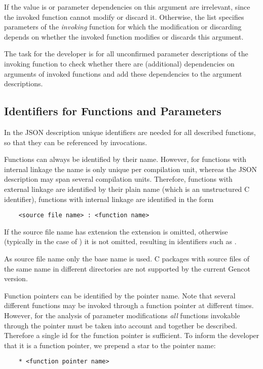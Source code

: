 If the value is  or  parameter dependencies on this argument are irrelevant, since
the invoked function cannot modify or discard it. Otherwise, the list specifies parameters of the \textit{invoking}
function for which the modification or discarding depends on whether the invoked function modifies or discards this
argument.

The task for the developer is for all unconfirmed parameter descriptions of the invoking function to check whether
there are (additional) dependencies on arguments of invoked functions and add these dependencies to the argument 
descriptions.

\subsection{Identifiers for Functions and Parameters}
\label{impl-parmod-ids}

In the JSON description unique identifiers are needed for all described functions, so that they can be referenced by
invocations.

Functions can always be identified by their name. However, for functions with internal linkage the name is only unique
per compilation unit, whereas the JSON description may span several compilation units. Therefore, functions with 
external linkage are identified by their plain name (which is an unstructured C identifier), functions with
internal linkage are identified in the form
\begin{verbatim}
    <source file name> : <function name>
\end{verbatim}
If the source file name has extension  the extension is omitted, otherwise (typically in the case of )
it is not omitted, resulting in identifiers such as .

As source file name only the base name is used. C packages with source files of the same name in different directories are
not supported by the current Gencot version.

Function pointers can be identified by the pointer name. Note that several different functions may be invoked through
a function pointer at different times. However, for the analysis of parameter modifications \textit{all} functions
invokable through the pointer must be taken into account and together be described. Therefore a single id for the function
pointer is sufficient. To inform the developer that it is a function pointer, we prepend a star to the pointer name:
\begin{verbatim}
    * <function pointer name>
\end{verbatim}

